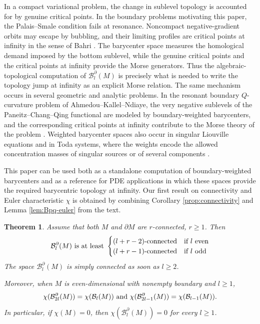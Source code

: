 \documentclass[11pt,a4paper]{article}
\numberwithin{equation}{section}
\newtheorem{thm}{Theorem}[section]
\theoremstyle{definition}
\theoremstyle{remark}
\newcommand{\pa}{\partial}
\newcommand{\ch}{\chi}
\newcommand{\BB}{\mathcal B}
\begin{document}
In a compact variational problem, the change in sublevel topology is accounted for by genuine critical points.  In the boundary problems motivating this paper, the Palais--Smale condition fails at resonance.  Noncompact negative-gradient orbits may escape by bubbling, and their limiting profiles are critical points at infinity in the sense of Bahri \cite{Bahri1989,BahriCoron1988,BahriCoron1991}.  The barycenter space measures the homological demand imposed by the bottom sublevel, while the genuine critical points and the critical points at infinity provide the Morse generators.  Thus the algebraic-topological computation of \(\BB_l^{\pa}(M)\) is precisely what is needed to write the topology jump at infinity as an explicit Morse relation.
The same mechanism occurs in several geometric and analytic problems.  In the resonant boundary \(Q\)-curvature problem of Ahmedou--Kallel--Ndiaye, the very negative sublevels of the Paneitz--Chang--Qing functional are modeled by boundary-weighted barycenters, and the corresponding critical points at infinity contribute to the Morse theory of the problem \cite{AKN2016}.  Weighted barycenter spaces also occur in singular Liouville equations and in Toda systems, where the weights encode the allowed concentration masses of singular sources or of several components \cite{CarlottoMalchiodi2012,malchiodi,JKM2015,Kallel2019}.  

This paper can be used both as a standalone computation of boundary-weighted barycenters and as a reference for PDE applications in which these spaces provide the required barycentric topology at infinity. 
Our first result on connectivity and Euler characteristic $\chi$ is obtained by combining Corollary \ref{prop:connectivity} and Lemma \ref{lem:Bpq-euler} from the text.

\begin{thm}\label{thm:intro-euler}
Assume that both \(M\) and \(\pa M\) are \(r\)-connected, $r\geq 1$. Then 
\begin{equation}\label{eq:connectivity-even}
\BB_l^{\pa}(M)\text{ is at least}\ \begin{cases}(l+r-2)\text{-connected}& \hbox{if $l$ even}\\
(l+r-1)\text{-connected}& \hbox{if $l$ odd}
\end{cases}
\end{equation} 
The space $\BB_l^\pa (M)$ is simply connected as soon as $l\ge 2$.

Moreover, when $M$ is even-dimensional with nonempty boundary and \(l\ge1\),
\begin{equation}\label{eq:intro-euler}
\ch(\BB_{2l}^{\pa}(M))=\ch(\BB_l(M))
\ \hbox{and}\ 
\ch(\BB_{2l-1}^{\pa}(M))=\ch(\BB_{l-1}(M)).
\end{equation}
In particular, if \(\ch(M)=0\), then \(\ch(\BB_l^{\pa}(M))=0\) for every \(l\ge1\).
\end{thm}
\end{document}
